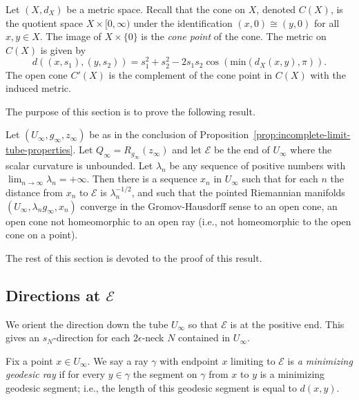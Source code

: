 Let $(X,d_X)$ be a metric space. Recall that the  cone on $X$,
denoted $C(X)$, is the quotient space $X\times [0,\infty)$ under the
identification $(x,0)\cong (y,0)$ for all $x,y\in X$. The image of
$X\times\{0\}$ is the {\sl cone point} of the cone. The metric on
$C(X)$ is given by
\begin{equation}\label{conemetric}
d((x,s_1),(y,s_2))=s_1^2+s_2^2-2s_1s_2\cos(\mathrm{min}(d_X(x,y),\pi)). \end{equation} The open cone $C'(X)$ is the
complement of the cone point in $C(X)$ with the induced metric.


The purpose of this section is to prove the following result.

\begin{proposition}
\label{prop:cone-limit-gromov-hausdorff}
\label{statement}
Let $(U_\infty,g_\infty,z_\infty)$  be as in the conclusion of
Proposition~\ref{prop:incomplete-limit-tube-properties}. Let $Q_\infty=R_{g_\infty}(z_\infty)$ and
let ${\mathcal E}$ be the end of $U_\infty$ where the scalar
curvature is unbounded. Let $\lambda_n$ be any sequence of positive
numbers with $\lim_{n\rightarrow\infty}\lambda_n=+\infty$. Then
there is a sequence $x_n$ in $U_\infty$ such that for each $n$ the
distance from $x_n$ to ${\mathcal E}$ is $\lambda_n^{-1/2}$, and
such that the pointed Riemannian manifolds
$(U_\infty,\lambda_ng_\infty,x_n)$ converge in the Gromov-Hausdorff
sense to an open cone, an open cone not homeomorphic to
an open ray (i.e., not homeomorphic to the open cone on a point).
\end{proposition}

The rest of this section is devoted to the proof of this result.

\subsection{Directions at ${\mathcal E}$}

 We orient the direction down the tube $U_\infty$ so that
${\mathcal E}$ is at the positive end. This gives an $s_N$-direction
for each $2\epsilon$-neck $N$ contained in $U_\infty$.




Fix a point $x\in U_\infty$. We say a ray $\gamma$ with endpoint $x$
limiting to ${\mathcal E}$ is {\sl a minimizing geodesic ray} if for
every $y\in \gamma$ the segment on $\gamma$ from $x$ to $y$ is a
minimizing geodesic segment; i.e., the length of this geodesic
segment is equal to $d(x,y)$.

